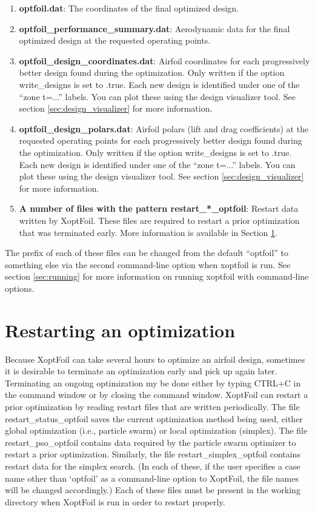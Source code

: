\documentclass[11pt]{article}
\begin{document}
\begin{enumerate}
\item{\textbf{optfoil.dat}: The coordinates of the final optimized design.}
\item{\textbf{optfoil\_performance\_summary.dat}: Aerodynamic data for the final optimized
design at the requested operating points.}
\item{\textbf{optfoil\_design\_coordinates.dat}: Airfoil coordinates for each
progressively better design found during the optimization.  Only written if the option
write\_designs is set to .true.  Each new design is identified under one of the ``zone
t=...'' labels.  You can plot these using the design visualizer tool. See section 
\ref{sec:design_visualizer} for more information.}
\item{\textbf{optfoil\_design\_polars.dat}: Airfoil polars (lift and drag coefficients) at
the requested operating points for each progressively better design found during the 
optimization.  Only written if the option write\_designs is set to .true.  Each new design
is identified under one of the ``zone t=...'' labels.  You can plot these using the design
visualizer tool. See section \ref{sec:design_visualizer} for more information.}
\item{\textbf{A number of files with the pattern restart\_*\_optfoil}: Restart data
written by XoptFoil.  These files are required to restart a prior optimization that was
terminated early. More information is available in Section \ref{sec:restarting}.}
\end{enumerate}

The prefix of each of these files can be changed from the default ``optfoil'' to something
else via the second command-line option when xoptfoil is run. See section
\ref{sec:running} for more information on running xoptfoil with command-line options.

\section{Restarting an optimization}\label{sec:restarting}

Because XoptFoil can take several hours to optimize an airfoil design, sometimes it is
desirable to terminate an optimization early and pick up again later.  Terminating an
ongoing optimization my be done either by typing CTRL+C in the command window or by
closing the command window.  XoptFoil can restart a prior optimization
by reading restart files that are written periodically. The file restart\_status\_optfoil
saves the current optimization method being used, either global optimization (i.e.,
particle swarm) or local optimization (simplex).  The file restart\_pso\_optfoil contains
data required by the particle swarm optimizer to restart a prior optimization. Similarly,
the file restart\_simplex\_optfoil contains restart data for the simplex search. (In each
of these, if the user specifies a case name other than `optfoil' as a command-line option
to XoptFoil, the file names will be changed accordingly.)  Each of these files must be
present in the working directory when XoptFoil is run in order to restart properly.
\end{document}
